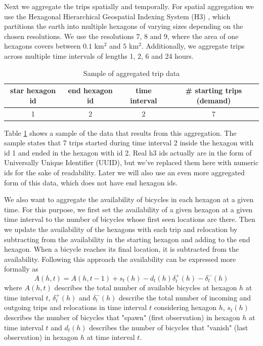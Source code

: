 Next we aggregate the trips spatially and temporally.
For spatial aggregation we use the Hexagonal Hierarchical Geospatial Indexing System (H3) , which partitions the earth into multiple hexagons of varying sizes depending on the chosen resolutions.
We use the resolutions 7, 8 and 9, where the area of one hexagons covers between \(0.1\) km\(^2\) and \(5\) km\(^2\).
Additionally, we aggregate trips across multiple time intervals of lengths 1, 2, 6 and 24 hours.


\begin{table}[h!]
    \centering
        \begin{tabular}{ c|c|c|c }
         star hexagon id & end hexagon id & time interval & \# starting trips (demand) \\ 
         \hline
         1 & 2 & 2 & 7 \\  
        \end{tabular}
    \caption{Sample of aggregated trip data}
    \label{table:aggregated_trips}
\end{table}

Table \ref{table:aggregated_trips} shows a sample of the data that results from this aggregation.
The sample states that 7 trips started during time interval 2 inside the hexagon with id 1 and ended in the hexagon with id 2.
Real h3 ids actually are in the form of Universally Unique Identifier (UUID), but we've replaced them here with numeric ids for the sake of readability.
Later we will also use an even more aggregated form of this data, which does not have end hexagon ids.



We also want to aggregate the availability of bicycles in each hexagon at a given time. 
For this purpose, we first set the availability of a given hexagon at a given time interval to the number of bicycles whose first seen locations are there.
Then we update the availability of the hexagons with each trip and relocation by subtracting from the availability in the starting hexagon and adding to the end hexagon. 
When a bicycle reaches its final location, it is subtracted from the availability.
Following this approach the availability can be expressed more formally as
\[A(h, t) = A(h, t-1) + s_t(h) - d_t(h) \delta_t^+(h) - \delta_t^-(h)\]
where \(A(h, t)\) describes the total number of available bicycles at hexagon \(h\) at time interval \(t\),
\(\delta_t^+(h)\) and \(\delta_t^-(h)\) describe the total number of incoming and outgoing trips and relocations in time interval \(t\) considering hexagon \(h\),
\(s_t(h)\) describes the number of bicycles that "spawn" (first observation) in hexagon \(h\) at time interval \(t\) and 
\(d_t(h)\) describes the number of bicycles that "vanish" (last observation) in hexagon \(h\) at time interval \(t\).



